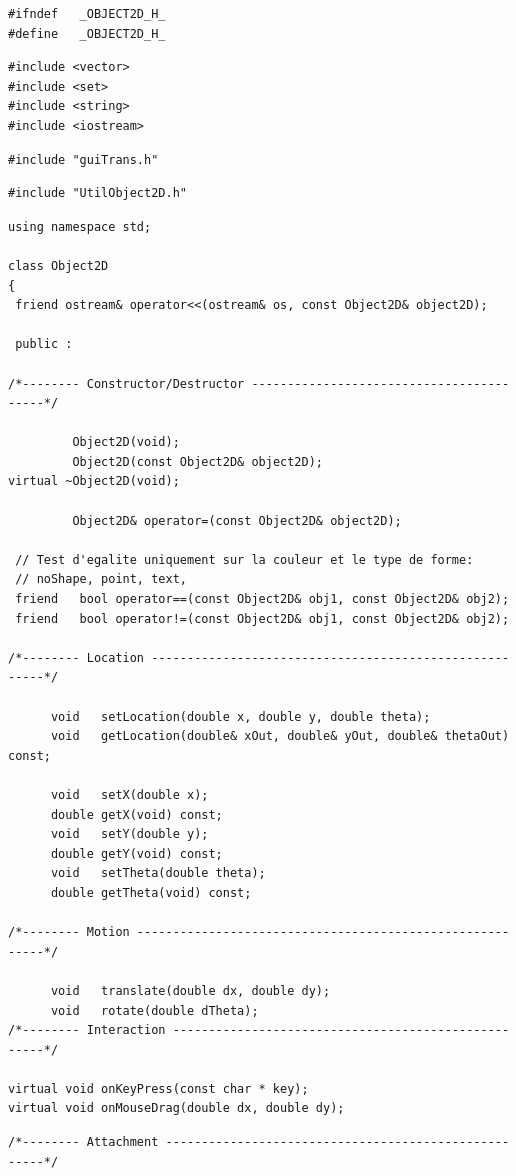 \documentclass[12pt]{article}
\begin{document}
\begin{small}
\begin{verbatim}
#ifndef   _OBJECT2D_H_
#define   _OBJECT2D_H_
\end{verbatim}
\begin{verbatim}
#include <vector>
#include <set>
#include <string>
#include <iostream>
\end{verbatim}
\begin{verbatim}
#include "guiTrans.h"
\end{verbatim}
\begin{verbatim}
#include "UtilObject2D.h"
\end{verbatim}
\begin{verbatim}
using namespace std;

class Object2D
{
 friend ostream& operator<<(ostream& os, const Object2D& object2D);

 public :

/*-------- Constructor/Destructor -----------------------------------------*/

         Object2D(void);
         Object2D(const Object2D& object2D);
virtual ~Object2D(void);

         Object2D& operator=(const Object2D& object2D);

 // Test d'egalite uniquement sur la couleur et le type de forme:
 // noShape, point, text, 
 friend   bool operator==(const Object2D& obj1, const Object2D& obj2);
 friend   bool operator!=(const Object2D& obj1, const Object2D& obj2);

/*-------- Location -------------------------------------------------------*/

      void   setLocation(double x, double y, double theta);
      void   getLocation(double& xOut, double& yOut, double& thetaOut) const;

      void   setX(double x);
      double getX(void) const;
      void   setY(double y);
      double getY(void) const;
      void   setTheta(double theta);
      double getTheta(void) const;

/*-------- Motion ---------------------------------------------------------*/

      void   translate(double dx, double dy);
      void   rotate(double dTheta);
/*-------- Interaction ----------------------------------------------------*/

virtual void onKeyPress(const char * key);
virtual void onMouseDrag(double dx, double dy);
\end{verbatim}
\begin{verbatim}
/*-------- Attachment -----------------------------------------------------*/


\end{verbatim}
\end{small}
\end{document}
